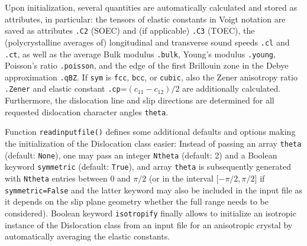 \documentclass[11pt,letterpaper,oneside,pdftex]{article}
\begin{document}
Upon initialization, several quantities are automatically calculated and stored as attributes, in particular:
the tensors of elastic constants in Voigt notation are saved as attributes \verb|.C2| (SOEC) and (if applicable) \verb|.C3| (TOEC),
the (polycrystalline averages of) longitudinal and transverse sound speeds \verb|.cl| and \verb|.ct|, as well as the average Bulk modulus \verb|.bulk|, Young's modulus \verb|.young|, Poisson's ratio \verb|.poisson|,
and the edge of the first Brillouin zone in the Debye approximation \verb|.qBZ|.
If \verb|sym| is \verb|fcc|, \verb|bcc|, or \verb|cubic|, also the Zener anisotropy ratio \verb|.Zener| and elastic constant \verb|.cp|=$(c_{11}-c_{12})/2$ are additionally calculated.
Furthermore, the dislocation line and slip directions are determined for all requested dislocation character angles \verb|theta|.

Function \verb|readinputfile()| defines some additional defaults and options making the initialization of the Dislocation class easier:
Instead of passing an array \verb|theta| (default: \verb|None|), one may pass an integer \verb|Ntheta| (default: 2) and a Boolean keyword \verb|symmetric| (default: \verb|True|), and array \verb|theta| is subsequently generated with \verb|Ntheta| entries between 0 and $\pi/2$ (or in the interval [$-\pi/2,\pi/2$] if \verb|symmetric=False| and the latter keyword may also be included in the input file as it depends on the slip plane geometry whether the full range needs to be considered).
Boolean keyword \verb|isotropify| finally allows to initialize an isotropic instance of the Dislocation class from an input file for an anisotropic crystal by automatically averaging the elastic constants.
\end{document}
